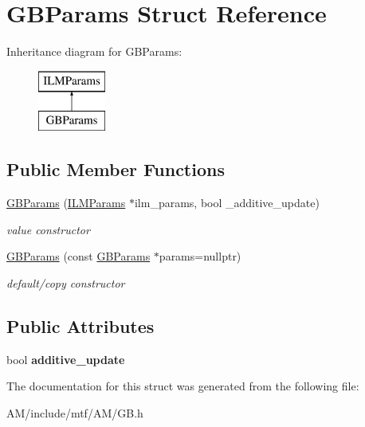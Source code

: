 \hypertarget{structGBParams}{\section{G\-B\-Params Struct Reference}
\label{structGBParams}
}
Inheritance diagram for G\-B\-Params\-:\begin{figure}[H]
\begin{center}
\leavevmode
\includegraphics[height=2.000000cm]{structGBParams}
\end{center}
\end{figure}
\subsection*{Public Member Functions}
\begin{DoxyCompactItemize}
\item 
\hypertarget{structGBParams_a3e0b0413313c47a11314d99eea563306}{\hyperlink{structGBParams_a3e0b0413313c47a11314d99eea563306}{G\-B\-Params} (\hyperlink{structILMParams}{I\-L\-M\-Params} $\ast$ilm\-\_\-params, bool \-\_\-additive\-\_\-update)}\label{structGBParams_a3e0b0413313c47a11314d99eea563306}

\begin{DoxyCompactList}\small\item\em value constructor \end{DoxyCompactList}\item 
\hypertarget{structGBParams_a5529d27c4a62dcade263a353efbd7d50}{\hyperlink{structGBParams_a5529d27c4a62dcade263a353efbd7d50}{G\-B\-Params} (const \hyperlink{structGBParams}{G\-B\-Params} $\ast$params=nullptr)}\label{structGBParams_a5529d27c4a62dcade263a353efbd7d50}

\begin{DoxyCompactList}\small\item\em default/copy constructor \end{DoxyCompactList}\end{DoxyCompactItemize}
\subsection*{Public Attributes}
\begin{DoxyCompactItemize}
\item 
\hypertarget{structGBParams_a90fee7300b2bad14230e31cd1ed253a8}{bool {\bfseries additive\-\_\-update}}\label{structGBParams_a90fee7300b2bad14230e31cd1ed253a8}

\end{DoxyCompactItemize}


The documentation for this struct was generated from the following file\-:\begin{DoxyCompactItemize}
\item 
A\-M/include/mtf/\-A\-M/G\-B.\-h\end{DoxyCompactItemize}
